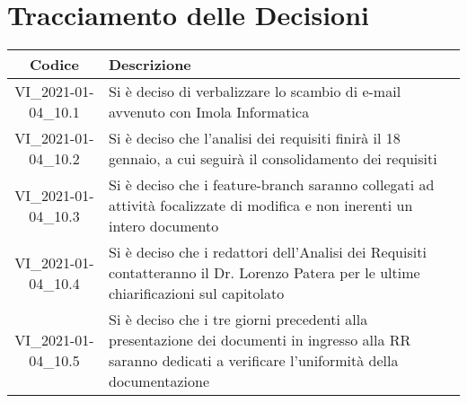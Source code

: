 \section*{Tracciamento delle Decisioni}

\begin{center}
	\begin{longtable}{|c|p{13cm}|}
	\hline
	\rowcolor{lighter-grayer}
	\textbf{Codice} & \textbf{Descrizione} \\
	\hline
	\endfirsthead

	\hline
	VI\_2021-01-04\_10.1 & Si è deciso di verbalizzare lo scambio di e-mail avvenuto con Imola Informatica\\
	\hline
	VI\_2021-01-04\_10.2 & Si è deciso che l'analisi dei requisiti finirà il 18 gennaio, a cui seguirà il consolidamento dei requisiti\\
	\hline
	VI\_2021-01-04\_10.3 & Si è deciso che i feature-branch saranno collegati ad attività focalizzate di modifica e non
inerenti un intero documento \\
	\hline
	VI\_2021-01-04\_10.4 & Si è deciso che i redattori dell’Analisi dei Requisiti contatteranno il Dr. Lorenzo Patera per le ultime
	chiarificazioni sul capitolato\\
	\hline
	VI\_2021-01-04\_10.5 & Si è deciso che i tre giorni precedenti alla presentazione dei documenti in ingresso alla RR saranno dedicati a verificare l'uniformità della documentazione\\
	\hline
	

	\end{longtable}
\end{center}